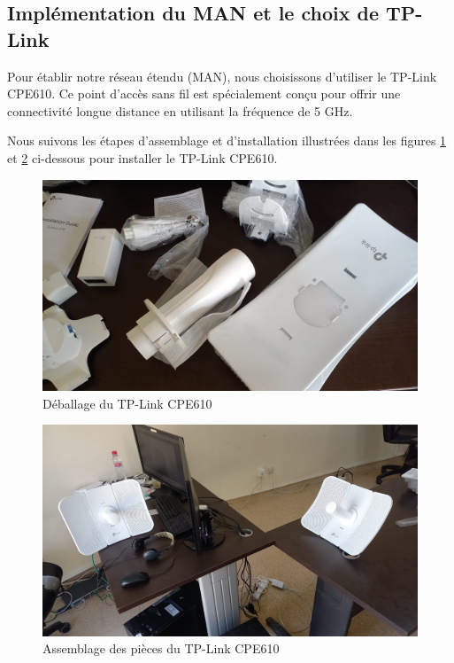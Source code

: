 \subsection{Implémentation du MAN et le choix de TP-Link}

Pour établir notre réseau étendu (MAN), nous choisissons  d'utiliser le TP-Link CPE610. Ce point d'accès sans fil est spécialement conçu pour offrir une connectivité longue distance en utilisant la fréquence de 5 GHz.

Nous suivons les étapes d'assemblage et d'installation illustrées dans les figures \ref{Chap2.3.2} et \ref{Chap2.3.4} ci-dessous pour installer le TP-Link CPE610.

\begin{figure}[H]
\centering
\includegraphics[width=15cm]{Images/SetupTPL4.jpg}
\caption{Déballage du TP-Link CPE610}
\label{Chap2.3.2}
\end{figure}

\begin{figure}[H]
\centering
\includegraphics[width=15cm]{Images/SetupTPL1.jpg}
\caption{Assemblage des pièces du TP-Link CPE610}
\label{Chap2.3.4}
\end{figure}


